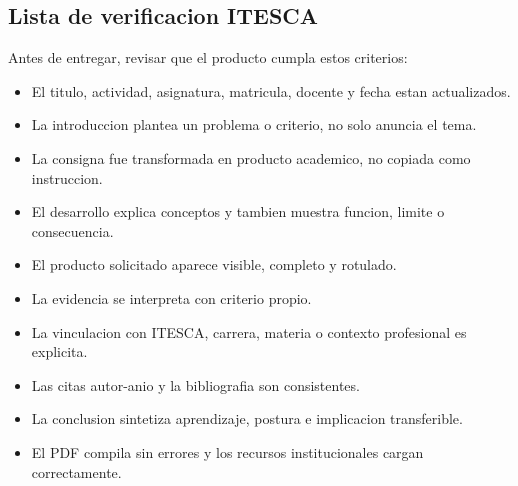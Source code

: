 \documentclass[
	spanish,
	letterpaper, oneside
]{article}
\newcommand{\pendiente}[1]{\textcolor{red}{[PENDIENTE: #1]}}
\begin{document}
\subsection{Lista de verificacion ITESCA}

Antes de entregar, revisar que el producto cumpla estos criterios:

\begin{itemize}
	\item El titulo, actividad, asignatura, matricula, docente y fecha estan actualizados.
	\item La introduccion plantea un problema o criterio, no solo anuncia el tema.
	\item La consigna fue transformada en producto academico, no copiada como instruccion.
	\item El desarrollo explica conceptos y tambien muestra funcion, limite o consecuencia.
	\item El producto solicitado aparece visible, completo y rotulado.
	\item La evidencia se interpreta con criterio propio.
	\item La vinculacion con ITESCA, carrera, materia o contexto profesional es explicita.
	\item Las citas autor-anio y la bibliografia son consistentes.
	\item La conclusion sintetiza aprendizaje, postura e implicacion transferible.
	\item El PDF compila sin errores y los recursos institucionales cargan correctamente.
\end{itemize}

\end{document}
